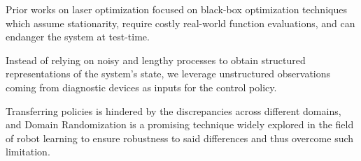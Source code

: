 {Prior works on laser optimization focused on black-box optimization techniques which assume stationarity, require costly real-world function evaluations, and can endanger the system at test-time.}

{Instead of relying on noisy and lengthy processes to obtain structured representations of the system's state, we leverage unstructured observations coming from diagnostic devices as inputs for the control policy.}

{Transferring policies is hindered by the discrepancies across different domains, and Domain Randomization is a promising technique widely explored in the field of robot learning to ensure robustness to said differences and thus overcome such limitation.}